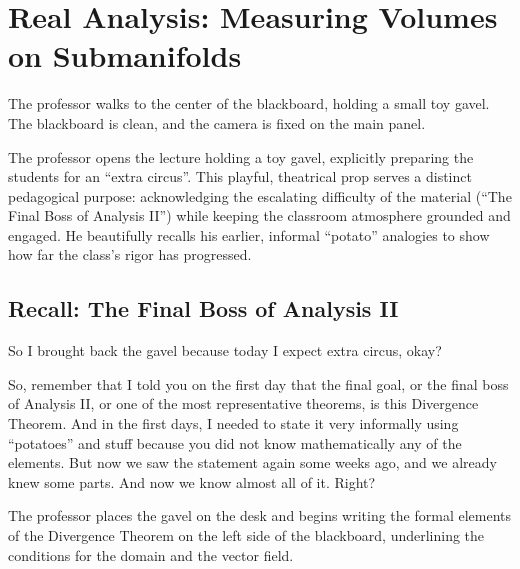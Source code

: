 \chapter{Real Analysis: Measuring Volumes on Submanifolds}

\begin{meta-note}
The professor walks to the center of the blackboard, holding a small toy gavel. The blackboard is clean, and the camera is fixed on the main panel.
\end{meta-note}

\begin{didactic-insight}
The professor opens the lecture holding a toy gavel, explicitly preparing the students for an ``extra circus''. This playful, theatrical prop serves a distinct pedagogical purpose: acknowledging the escalating difficulty of the material (``The Final Boss of Analysis II'') while keeping the classroom atmosphere grounded and engaged. He beautifully recalls his earlier, informal ``potato'' analogies to show how far the class's rigor has progressed.
\end{didactic-insight}


\section{Recall: The Final Boss of Analysis II}

\begin{spoken-clean}[00:00:00 - 00:00:58]
So I brought back the gavel because today I expect extra circus, okay? 

So, remember that I told you on the first day that the final goal, or the final boss of Analysis II, or one of the most representative theorems, is this Divergence Theorem. And in the first days, I needed to state it very informally using ``potatoes'' and stuff because you did not know mathematically any of the elements. But now we saw the statement again some weeks ago, and we already knew some parts. And now we know almost all of it. Right? 
\end{spoken-clean}

\begin{nice-box}
The professor places the gavel on the desk and begins writing the formal elements of the Divergence Theorem on the left side of the blackboard, underlining the conditions for the domain and the vector field.
\end{nice-box}


